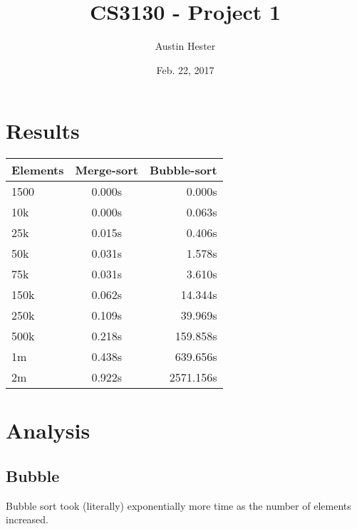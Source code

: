 \documentclass{article}
\begin{document}
\title{CS3130 - Project 1}
\author{Austin Hester}
\date{Feb. 22, 2017}
\maketitle


\makeatletter
\def\@seccntformat#1{%
	 \expandafter\ifx\csname c@#1\endcsname\c@section\else
	  \csname the#1\endcsname\quad
  \fi}
\makeatother



\section{Results}

\begin{center}
\begin{tabular}{ | l | c | r | }
	\hline
	 Elements & Merge-sort & Bubble-sort \\ \hline  \hline
	1500 & 0.000s & 0.000s \\
	10k & 0.000s & 0.063s \\
	25k & 0.015s & 0.406s \\
	50k & 0.031s & 1.578s \\
	75k & 0.031s & 3.610s \\
	150k & 0.062s & 14.344s \\
	250k & 0.109s & 39.969s \\
	500k & 0.218s & 159.858s \\
	1m & 0.438s & 639.656s \\
	2m & 0.922s & 2571.156s \\
	\hline
\end{tabular}
\end{center}



\section{Analysis}


\subsection{Bubble}

Bubble sort took (literally) exponentially more time as the number of elements increased. \\
\end{document}

